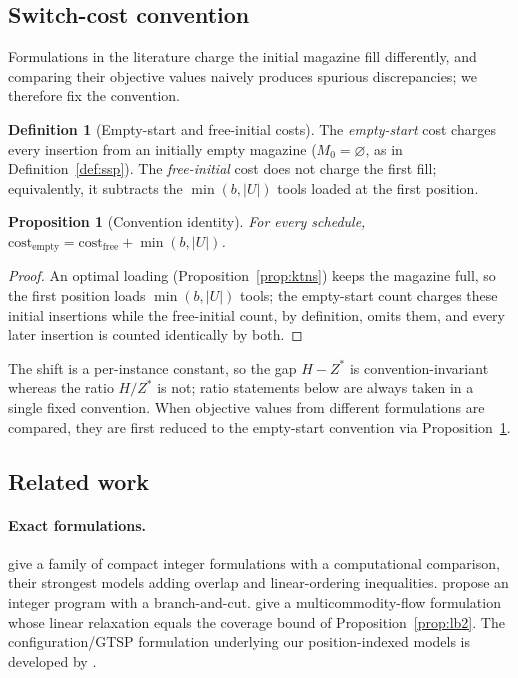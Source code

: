 \documentclass[11pt,a4paper]{article}
\theoremstyle{plain}
\newtheorem{proposition}{Proposition}
\theoremstyle{definition}
\newtheorem{definition}{Definition}
\theoremstyle{remark}
\newcommand{\U}{U}
\newcommand{\Zst}{Z^{\ast}}
\begin{document}
\subsection{Switch-cost convention}\label{ssec:conv}
Formulations in the literature charge the initial magazine fill differently, and
comparing their objective values naively produces spurious discrepancies; we
therefore fix the convention.
\begin{definition}[Empty-start and free-initial costs]\label{def:conv}
The \emph{empty-start} cost charges every insertion from an initially empty magazine
($M_0=\varnothing$, as in Definition~\ref{def:ssp}). The \emph{free-initial} cost
does not charge the first fill; equivalently, it subtracts the $\min(b,\lvert\U
\rvert)$ tools loaded at the first position.
\end{definition}
\begin{proposition}[Convention identity]\label{prop:conv}
For every schedule, $\text{cost}_{\mathrm{empty}}=\text{cost}_{\mathrm{free}}+
\min(b,\lvert\U\rvert)$.
\end{proposition}
\begin{proof}
An optimal loading (Proposition~\ref{prop:ktns}) keeps the magazine full, so the
first position loads $\min(b,\lvert\U\rvert)$ tools; the empty-start count charges
these initial insertions while the free-initial count, by definition, omits them,
and every later insertion is counted identically by both.
\end{proof}
\noindent The shift is a per-instance constant, so the gap $H-\Zst$ is
convention-invariant whereas the ratio $H/\Zst$ is not; ratio statements below are
always taken in a single fixed convention. When objective values from different
formulations are compared, they are first reduced to the empty-start convention via
Proposition~\ref{prop:conv}.

\subsection{Related work}\label{ssec:related}
\paragraph{Exact formulations.}
\citet{Catanzaro2015} give a family of compact integer formulations with a
computational comparison, their strongest models adding overlap and
linear-ordering inequalities. \citet{Laporte2004} propose an integer program with a
branch-and-cut. \citet{daSilva2024} give a multicommodity-flow formulation whose
linear relaxation equals the coverage bound of Proposition~\ref{prop:lb2}. The
configuration/GTSP formulation underlying our position-indexed models is developed
by \citet{Colares2026Exact,Colares2026Tool}.
\end{document}
